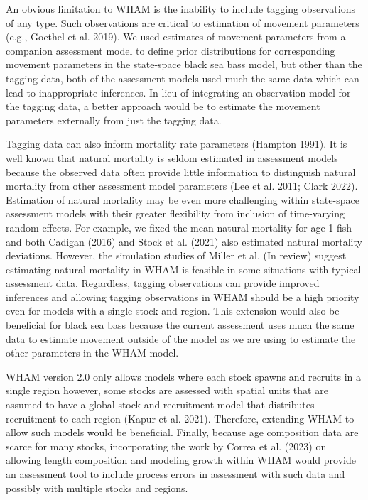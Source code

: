 \documentclass[
]{article}
\begin{document}
An obvious limitation to WHAM is the inability to include tagging observations of any type. Such observations are critical to estimation of movement parameters (e.g., Goethel et al. 2019). We used estimates of movement parameters from a companion assessment model to define prior distributions for corresponding movement parameters in the state-space black sea bass model, but other than the tagging data, both of the assessment models used much the same data which can lead to inappropriate inferences. In lieu of integrating an observation model for the tagging data, a better approach would be to estimate the movement parameters externally from just the tagging data.

Tagging data can also inform mortality rate parameters (Hampton 1991). It is well known that natural mortality is seldom estimated in assessment models because the observed data often provide little information to distinguish natural mortality from other assessment model parameters (Lee et al. 2011; Clark 2022). Estimation of natural mortality may be even more challenging within state-space assessment models with their greater flexibility from inclusion of time-varying random effects. For example, we fixed the mean natural mortality for age 1 fish and both Cadigan (2016) and Stock et al. (2021) also estimated natural mortality deviations. However, the simulation studies of Miller et al. (In review) suggest estimating natural mortality in WHAM is feasible in some situations with typical assessment data. Regardless, tagging observations can provide improved inferences and allowing tagging observations in WHAM should be a high priority even for models with a single stock and region. This extension would also be beneficial for black sea bass because the current assessment uses much the same data to estimate movement outside of the model as we are using to estimate the other parameters in the WHAM model.

WHAM version 2.0 only allows models where each stock spawns and recruits in a single region however, some stocks are assessed with spatial units that are assumed to have a global stock and recruitment model that distributes recruitment to each region (Kapur et al. 2021). Therefore, extending WHAM to allow such models would be beneficial. Finally, because age composition data are scarce for many stocks, incorporating the work by Correa et al. (2023) on allowing length composition and modeling growth within WHAM would provide an assessment tool to include process errors in assessment with such data and possibly with multiple stocks and regions.
\end{document}
